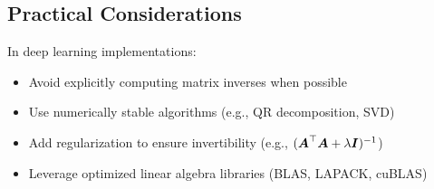 \subsection{Practical Considerations}

In deep learning implementations:
\begin{itemize}
    \item Avoid explicitly computing matrix inverses when possible
    \item Use numerically stable algorithms (e.g., QR decomposition, SVD)
    \item Add regularization to ensure invertibility (e.g., $(\boldsymbol{A}^\top\boldsymbol{A} + \lambda\boldsymbol{I})^{-1}$)
    \item Leverage optimized linear algebra libraries (BLAS, LAPACK, cuBLAS)
\end{itemize}
